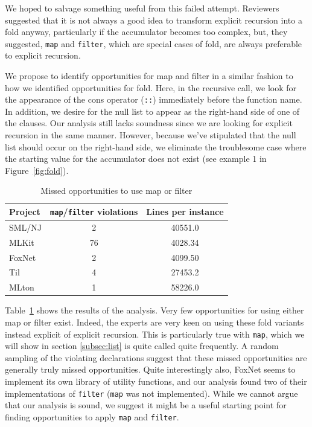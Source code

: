 \documentclass[12pt,abstracton]{scrartcl}
\begin{document}
We hoped to salvage something useful from this failed attempt.
Reviewers suggested that it is not always a good idea to transform
explicit recursion into a fold anyway, particularly if the accumulator becomes
too complex, but, they suggested, \texttt{map} and \texttt{filter}, which are
special cases of fold, are always preferable to explicit recursion.

We propose to identify opportunities for map and filter
in a similar fashion to how we identified opportunities for fold.
Here, in the recursive call, we look for the appearance of the cons operator (\texttt{::})
immediately before the function name. In addition, we desire for the
null list to appear as the right-hand side of one of the clauses.
Our analysis still lacks soundness since we are looking for
explicit recursion in the same manner. However, because we've stipulated
that the null list should occur on the right-hand side, we eliminate
the troublesome case where the starting value for the accumulator does not exist
(see example 1 in Figure~\ref{fig:fold}).

\begin{table}[h!]
\centering
\begin{tabular}{|l||c|c|}\hline
Project & \texttt{map}/\texttt{filter} violations & Lines per instance \\ \hline\hline
SML/NJ & 2 & 40551.0 \\
MLKit & 76 & 4028.34 \\
FoxNet & 2 & 4099.50 \\
Til & 4 & 27453.2 \\
MLton & 1 & 58226.0 \\ \hline
\end{tabular}
\caption{Missed opportunities to use map or filter}
\label{table:mapfilter}
\end{table}

Table~\ref{table:mapfilter} shows the results of the analysis.
Very few opportunities for using either map or filter exist.
Indeed, the experts are very keen on using these fold variants
instead explicit of explicit recursion.
This is particularly true with \texttt{map}, which we will show in section \ref{subsec:list}
is quite called quite frequently.
A random sampling of the violating declarations suggest that
these missed opportunities are generally truly missed opportunities.
Quite interestingly also, FoxNet seems to implement its own library
of utility functions, and our analysis found two of their
implementations of \texttt{filter} (\texttt{map} was not implemented).
While we cannot argue that our analysis is sound, we suggest it might
be a useful starting point for finding opportunities to apply
\texttt{map} and \texttt{filter}.
\end{document}
